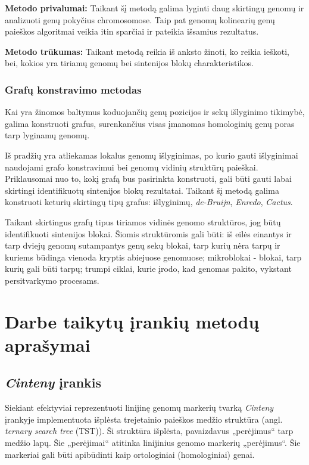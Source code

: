 \documentclass[12pt]{article}
\begin{document}
\textbf{Metodo privalumai:} Taikant šį metodą galima lyginti daug skirtingų
genomų ir analizuoti genų pokyčius chromosomose. Taip pat genomų kolinearių
genų paieškos algoritmai veikia itin sparčiai ir pateikia išsamius rezultatus.

\textbf{Metodo trūkumas:} Taikant metodą reikia iš anksto žinoti, ko reikia
ieškoti, bei, kokios yra tiriamų genomų bei sintenijos blokų charakteristikos.

\subsubsection*{Grafų konstravimo metodas}
Kai yra žinomos baltymus koduojančių genų pozicijos ir sekų išlyginimo tikimybė,
galima konstruoti grafus, surenkančius visas įmanomas homologinių genų poras
tarp lyginamų genomų\cite{ARTICLE4}.

Iš pradžių yra atliekamas lokalus genomų išlyginimas, po kurio gauti išlyginimai
naudojami grafo konstravimui bei genomų vidinių struktūrų paieškai. Priklausomai
nuo to, kokį grafą bus pasirinkta konstruoti, gali būti gauti labai skirtingi
identifikuotų sintenijos blokų rezultatai. Taikant šį metodą galima konstruoti
keturių skirtingų tipų grafus: išlyginimų, \emph{de-Bruijn}\cite{DEBRUIJN},
\emph{Enredo}\cite{ENREDO}, \emph{Cactus}\cite{CACTUS}.

Taikant skirtingus grafų tipus tiriamos vidinės genomo struktūros, jog būtų
identifikuoti sintenijos blokai. Šiomis struktūromis gali būti: iš eilės
einantys ir tarp dviejų genomų sutampantys genų sekų blokai, tarp kurių nėra
tarpų ir kuriems būdinga vienoda kryptis abiejuose genomuose; mikroblokai -
blokai, tarp kurių gali būti tarpų; trumpi ciklai, kurie įrodo, kad genomas
pakito, vykstant persitvarkymo procesams\cite{ARTICLE4}.

\newpage


\section{Darbe taikytų įrankių metodų aprašymai}
\subsection{\emph{Cinteny} įrankis}
Siekiant efektyviai reprezentuoti linijinę genomų markerių tvarką
\emph{Cinteny}\cite{CINTENY} įrankyje
implementuota išplėsta trejetainio paieškos medžio struktūra\cite{TST} (angl.
\emph{ternary search tree} (TST)). Ši struktūra išplėsta, pavaizdavus 
„perėjimus“ tarp medžio lapų. Šie „perėjimai“ atitinka linijinius genomo
markerių „perėjimus“. Šie markeriai gali būti apibūdinti kaip ortologiniai
(homologiniai) genai.
\end{document}
